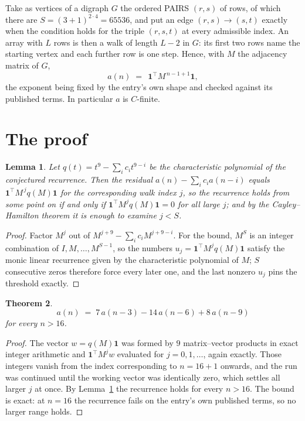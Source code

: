 \documentclass[11pt,a4paper]{article}
\theoremstyle{plain}
\newtheorem{theorem}{Theorem}
\newtheorem{lemma}[theorem]{Lemma}
\theoremstyle{definition}
\begin{document}
Take as vertices of a digraph $G$ the ordered PAIRS $(r,s)$ of rows, of which there are
$S=(3+1)^{2\cdot4}=65536$, and put an edge $(r,s)\to(s,t)$ exactly when the condition
holds for the triple $(r,s,t)$ at every admissible index. An array with $L$ rows is then a
walk of length $L-2$ in $G$: its first two rows name the starting vertex and each further
row is one step. Hence, with $M$ the adjacency matrix of $G$,
\[
a(n)\;=\;\,\mathbf{1}^{\!\top}M^{\,n-1+1}\mathbf{1},
\]
the exponent being fixed by the entry's own shape and checked against its published terms.
In particular $a$ is $C$-finite.

\section{The proof}

\begin{lemma}\label{lem:crit}
Let $q(t)=t^{9}-\sum_i c_it^{9-i}$ be the characteristic polynomial of the
conjectured recurrence. Then the residual $a(n)-\sum_ic_ia(n-i)$ equals
$\mathbf{1}^{\!\top}M^{\,j}q(M)\mathbf{1}$ for the corresponding walk index
$j$, so the recurrence holds from some point on if and only if
$\mathbf{1}^{\!\top}M^{j}q(M)\mathbf{1}=0$ for all large $j$; and by the
Cayley--Hamilton theorem it is enough to examine $j<S$.
\end{lemma}

\begin{proof}
Factor $M^{j}$ out of $M^{j+9}-\sum_ic_iM^{j+9-i}$. For the bound, $M^{S}$
is an integer combination of $I,M,\dots,M^{S-1}$, so the numbers
$u_j=\mathbf{1}^{\!\top}M^{j}q(M)\mathbf{1}$ satisfy the monic linear recurrence given by
the characteristic polynomial of $M$; $S$ consecutive zeros therefore force every later one,
and the last nonzero $u_j$ pins the threshold exactly.
\end{proof}

\begin{theorem}
\[
a(n)\;=\;7\,a(n-3) - 14\,a(n-6) + 8\,a(n-9)
\]
for every $n>16$.
\end{theorem}

\begin{proof}
The vector $w=q(M)\mathbf{1}$ was formed by $9$ matrix--vector products in exact
integer arithmetic and $\mathbf{1}^{\!\top}M^{j}w$ evaluated for $j=0,1,\dots$, again
exactly. Those integers vanish from the index corresponding to $n=16+1$ onwards, and the
run was continued until the working vector was identically zero, which settles all larger $j$
at once. By Lemma~\ref{lem:crit} the recurrence holds for every $n>16$. The bound is exact: at $n=16$ the recurrence fails on the entry's own published terms, so no larger range holds.
\end{proof}
\end{document}
